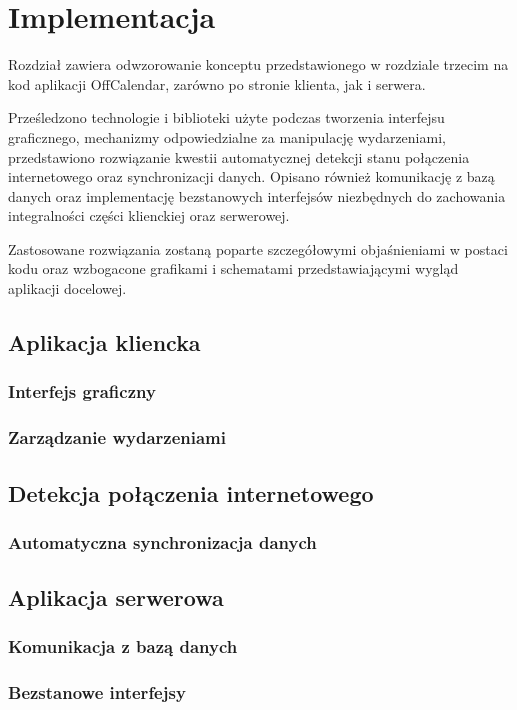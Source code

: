 \chapter{Implementacja}
\label{cha:impl}

Rozdział zawiera odwzorowanie konceptu przedstawionego w rozdziale trzecim na kod aplikacji \mbox{OffCalendar}, zarówno po stronie klienta, jak i serwera. 

Prześledzono technologie i biblioteki użyte podczas tworzenia interfejsu graficznego, mechanizmy odpowiedzialne za manipulację wydarzeniami, przedstawiono rozwiązanie kwestii automatycznej detekcji stanu połączenia internetowego oraz synchronizacji danych. Opisano również komunikację z bazą danych oraz implementację bezstanowych interfejsów niezbędnych do zachowania integralności części klienckiej oraz serwerowej.

Zastosowane rozwiązania zostaną poparte szczegółowymi objaśnieniami w postaci kodu oraz wzbogacone grafikami i schematami przedstawiającymi wygląd aplikacji docelowej.


\section{Aplikacja kliencka}
\label{sec:apKli}



\subsection{Interfejs graficzny}
\label{sec:intGraf}



\subsection{Zarządzanie wydarzeniami}
\label{sec:zarzWyd}



\section{Detekcja połączenia internetowego}
\label{sec:detPolInt}



\subsection{Automatyczna synchronizacja danych}
\label{autSynDanych}


\section{Aplikacja serwerowa}
\label{sec:apSerw}



\subsection{Komunikacja z bazą danych}
\label{komBazaDanych}



\subsection{Bezstanowe interfejsy}
\label{bezstInter}